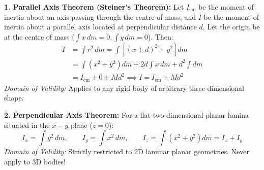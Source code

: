 \documentclass[10pt,twoside,openright]{book}
\begin{document}
\begin{formulabox}
\textbf{1. Parallel Axis Theorem (Steiner's Theorem):}
Let $I_{\text{cm}}$ be the moment of inertia about an axis passing through the centre of mass, and $I$ be the moment of inertia about a parallel axis located at perpendicular distance $d$.
Let the origin be at the centre of mass ($\int x\,dm = 0, \int y\,dm = 0$). Then:
\begin{align}
  I &= \int r^2\,dm = \int \left[(x + d)^2 + y^2\right] dm \nonumber \\
  &= \int (x^2 + y^2)dm + 2d\int x\,dm + d^2\int dm \nonumber \\
  &= I_{\text{cm}} + 0 + M d^2 \implies I = I_{\text{cm}} + M d^2
\end{align}
\textit{Domain of Validity:} Applies to any rigid body of arbitrary three-dimensional shape.

\textbf{2. Perpendicular Axis Theorem:}
For a flat two-dimensional planar lamina situated in the $x-y$ plane ($z = 0$):
\begin{equation}
  I_x = \int y^2\,dm, \qquad I_y = \int x^2\,dm, \qquad I_z = \int (x^2 + y^2)dm = I_x + I_y
\end{equation}
\textit{Domain of Validity:} Strictly restricted to 2D laminar planar geometries. Never apply to 3D bodies!
\end{formulabox}
\end{document}

